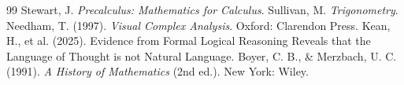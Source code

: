 \documentclass[11pt,twoside]{book}
\theoremstyle{plain}
\theoremstyle{definition}
\theoremstyle{remark}
\begin{document}
\appendix
\backmatter




\begin{thebibliography}{99}
 Stewart, J. \emph{Precalculus: Mathematics for Calculus}.
 Sullivan, M. \emph{Trigonometry}.
 Needham, T. (1997). \emph{Visual Complex Analysis}.
Oxford: Clarendon Press.
 Kean, H., et al. (2025). Evidence from Formal Logical
Reasoning Reveals that the Language of Thought is not Natural Language.
 Boyer, C. B., \& Merzbach, U. C. (1991). \emph{A
History of Mathematics} (2nd ed.). New York: Wiley.
\end{thebibliography}
\end{document}
